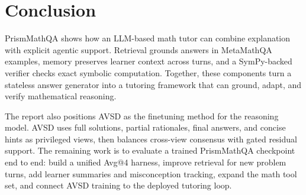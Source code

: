 \section{Conclusion}

PrismMathQA shows how an LLM-based math tutor can combine explanation with explicit agentic support. Retrieval grounds answers in MetaMathQA examples, memory preserves learner context across turns, and a SymPy-backed verifier checks exact symbolic computation. Together, these components turn a stateless answer generator into a tutoring framework that can ground, adapt, and verify mathematical reasoning.

The report also positions AVSD as the finetuning method for the reasoning model. AVSD uses full solutions, partial rationales, final answers, and concise hints as privileged views, then balances cross-view consensus with gated residual support. The remaining work is to evaluate a trained PrismMathQA checkpoint end to end: build a unified Avg@4 harness, improve retrieval for new problem turns, add learner summaries and misconception tracking, expand the math tool set, and connect AVSD training to the deployed tutoring loop.
